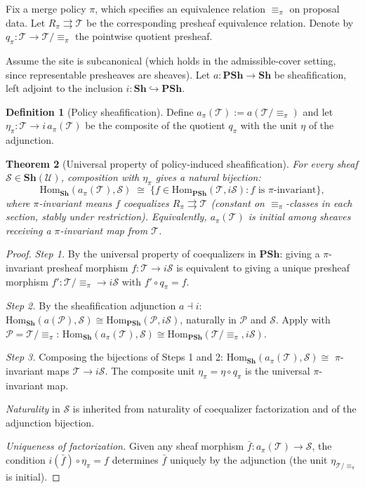 \documentclass[12pt,a4paper]{article}
\newtheorem{theorem}{Theorem}[section]
\theoremstyle{definition}
\newtheorem{definition}[theorem]{Definition}
\theoremstyle{remark}
\newcommand{\Hom}{\mathrm{Hom}}
\newcommand{\PSh}{\mathbf{PSh}}
\newcommand{\Sh}{\mathbf{Sh}}
\begin{document}
Fix a merge policy $\pi$, which specifies an equivalence relation $\equiv_\pi$ on
proposal data. Let $R_\pi\rightrightarrows\mathcal{T}$ be the corresponding presheaf
equivalence relation. Denote by $q_\pi:\mathcal{T}\to\mathcal{T}/{\equiv_\pi}$ the
pointwise quotient presheaf.

Assume the site is subcanonical (which holds in the admissible-cover setting, since
representable presheaves are sheaves). Let $a:\PSh\to\Sh$ be sheafification, left
adjoint to the inclusion $i:\Sh\hookrightarrow\PSh$.

\begin{definition}[Policy sheafification]
\label{def:policy-sheaf}
Define $a_\pi(\mathcal{T}):=a(\mathcal{T}/{\equiv_\pi})$ and let
$\eta_\pi:\mathcal{T}\to i\,a_\pi(\mathcal{T})$ be the composite of the quotient
$q_\pi$ with the unit $\eta$ of the adjunction.
\end{definition}

\begin{theorem}[Universal property of policy-induced sheafification]
\label{thm:sheafification}
For every sheaf $\mathcal{S}\in\Sh(\mathcal{U})$, composition with $\eta_\pi$ gives
a natural bijection:
\[
  \Hom_{\Sh}(a_\pi(\mathcal{T}),\mathcal{S})
  \;\cong\;
  \{f\in\Hom_{\PSh}(\mathcal{T},i\mathcal{S}):f\text{ is }\pi\text{-invariant}\},
\]
where $\pi$-invariant means $f$ coequalizes $R_\pi\rightrightarrows\mathcal{T}$
(constant on $\equiv_\pi$-classes in each section, stably under restriction).
Equivalently, $a_\pi(\mathcal{T})$ is initial among sheaves receiving a $\pi$-invariant
map from $\mathcal{T}$.
\end{theorem}

\begin{proof}
\textit{Step 1.} By the universal property of coequalizers in $\PSh$: giving a
$\pi$-invariant presheaf morphism $f:\mathcal{T}\to i\mathcal{S}$ is equivalent to
giving a unique presheaf morphism $f':\mathcal{T}/{\equiv_\pi}\to i\mathcal{S}$
with $f'\circ q_\pi=f$.

\textit{Step 2.} By the sheafification adjunction $a\dashv i$:
$\Hom_\Sh(a(\mathcal{P}),\mathcal{S})\cong\Hom_\PSh(\mathcal{P},i\mathcal{S})$,
naturally in $\mathcal{P}$ and $\mathcal{S}$. Apply with $\mathcal{P}=
\mathcal{T}/{\equiv_\pi}$: $\Hom_\Sh(a_\pi(\mathcal{T}),\mathcal{S})
\cong\Hom_\PSh(\mathcal{T}/{\equiv_\pi},i\mathcal{S})$.

\textit{Step 3.} Composing the bijections of Steps 1 and 2:
$\Hom_\Sh(a_\pi(\mathcal{T}),\mathcal{S})\cong$ $\pi$-invariant maps
$\mathcal{T}\to i\mathcal{S}$. The composite unit $\eta_\pi=\eta\circ q_\pi$ is the
universal $\pi$-invariant map.

\textit{Naturality} in $\mathcal{S}$ is inherited from naturality of coequalizer
factorization and of the adjunction bijection.

\textit{Uniqueness of factorization.} Given any sheaf morphism $\bar{f}:
a_\pi(\mathcal{T})\to\mathcal{S}$, the condition $i(\bar{f})\circ\eta_\pi=f$
determines $\bar{f}$ uniquely by the adjunction (the unit $\eta_{\mathcal{T}/\equiv_\pi}$
is initial).
\end{proof}
\end{document}
